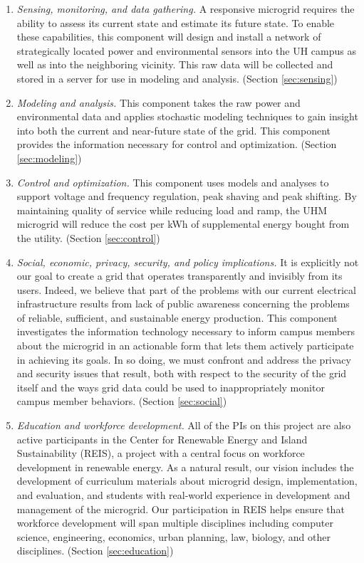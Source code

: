 \begin{enumerate}

\item {\em Sensing, monitoring, and data gathering.} A responsive microgrid requires the
  ability to assess its current state and estimate its future state.  To
  enable these capabilities, this component will design and install a
  network of strategically located power and environmental sensors into the
  UH campus as well as into the neighboring vicinity. This raw data will be
  collected and stored in a server for use in modeling and
  analysis. (Section \ref{sec:sensing})

\item {\em Modeling and analysis.}  This component takes the raw power and
  environmental data and applies stochastic modeling techniques to gain
  insight into both the current and near-future state of the grid.  This
  component provides the information necessary for control and
  optimization. (Section \ref{sec:modeling})

\item {\em Control and optimization.}  This component uses models and
  analyses to support voltage and frequency regulation, peak shaving and
  peak shifting.  By maintaining quality of service while reducing load and
  ramp, the UHM microgrid will reduce the cost per kWh of
  supplemental energy bought from the utility. (Section \ref{sec:control})

\item {\em Social, economic, privacy, security, and policy implications.}
  It is explicitly not our goal to create a grid that operates
  transparently and invisibly from its users.  Indeed, we believe that part
  of the problems with our current electrical infrastructure results from
  lack of public awareness concerning the problems of reliable, sufficient,
  and sustainable energy production.  This component investigates the
  information technology necessary to inform campus members about the
  microgrid in an actionable form that lets them actively participate in
  achieving its goals.  In so doing, we must confront and address the
  privacy and security issues that result, both with respect to the
  security of the grid itself and the ways grid data could be used to
  inappropriately monitor campus member behaviors. (Section \ref{sec:social})

\item {\em Education and workforce development.} All of the PIs on this
  project are also active participants in the Center for Renewable Energy
  and Island Sustainability (REIS), a project with a central focus on
  workforce development in renewable energy.  As a natural result, our
  vision includes the development of curriculum materials about microgrid
  design, implementation, and evaluation, and students with real-world
  experience in development and management of the microgrid.  Our participation in REIS
  helps ensure that workforce development will span multiple disciplines
  including computer science, engineering, economics, urban planning, law,
  biology, and other disciplines. (Section \ref{sec:education})

\end{enumerate}

